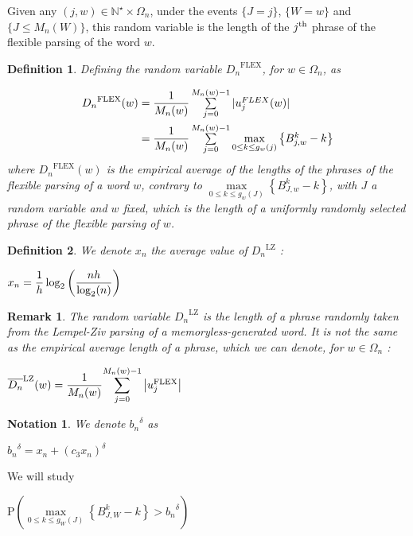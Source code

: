 \documentclass[11pt]{article}
\newtheorem{df}{Definition}
\newtheorem{rmk}{Remark}
\newtheorem{nota}{Notation}
\newcommand{\proba}[1]{\text{P} \left( #1 \right) }
\newcommand{\centers}[2][2]{
    \begin{center}
    {#2}\end{center}}
\newcommand{\f}[2]{{
	\mathchoice%
		{\dfrac{#1}{#2}}
    	{\dfrac{#1}{#2}}
		{\frac{#1}{#2}}
		{\frac{#1}{#2}}
}}
\newcommand{\pa}[2][9]{\left( #2 \right)}
\newcommand\Sum[2]{\textstyle\sum\limits_{#1}^{#2}}
\newcommand{\SUM}[2]{{\displaystyle\sum\limits_{#1}^{#2}}}
\begin{document}
\noindent
Given any $(j,w) \in \mathbb{N}^{\star} \times \Omega_n$,
under the events $\{ J = j \}$, $\{ W = w \}$ and $\{ J \leq M_n(W) \}$, 
this random variable is the length of 
the $j^{\textmd{th}}$ phrase of the flexible parsing of the word $w$.

\begin{df}
Defining the random variable ${D_n}^{\text{FLEX}}$, for $w\in\Omega_n$, as

\begin{align*}
    {D_n}^{\text{FLEX}} (w)
        &= \f{1}{M_n(w)} \Sum{j=0}{M_n(w)-1} |u_j^{FLEX}(w)| \\
        &= \f{1}{M_n(w)} \Sum{j=0}{M_n(w)-1}  
                                \underset{ 0 \leq k \leq g_w(j) }{ \max } 
                                \left\{ { B_{j, w}^k - k } \right\}
\end{align*}
\noindent
where ${D_n}^{\text{FLEX}}(w)$ is the empirical average of the lengths of the phrases
of the flexible parsing of a word $w$, contrary to
        $\underset{ 0 \leq k \leq g_w(J) }{ \max } 
        \left\{ { B_{J, w}^k - k } \right\} $,
with $J$ a random variable and $w$ fixed,
which is the length of a uniformly randomly selected 
phrase of the flexible parsing of $w$. 
\end{df}

\begin{df}
    We denote $x_n$ the average value of ${D_n}^{\text{LZ}}$ :
    \centers{$x_n = \f1{h} \log_2 \pa{ \f{nh}{\log_2(n)} }$}
\end{df}

\begin{rmk}
    The random variable ${D_n}^{\text{LZ}}$ is the
    length of a phrase randomly taken from the 
    Lempel-Ziv parsing 
    of a memoryless-generated word. It is not the same as
    the empirical average length of a phrase, which we can
    denote,
    for $w \in \Omega_n$ :
    \centers{$ \overline{D_n}^{\text{LZ}}(w)
                = \f{1}{M_n(w)}
                    \SUM{j=0}{M_n(w)-1} \left| 
                                        u_j^{\text{FLEX}}
                                        \right| $}
\end{rmk}

\begin{nota}
    We denote ${b_n}^{\delta}$ as
    \centers{${b_n}^{\delta} = x_n + (c_3 x_n)^{\delta}$}
\end{nota}

\noindent
We will study
    \centers
    {$ \proba{ 
        \underset{ 0 \leq k \leq g_{\scriptscriptstyle W}(J) }{ \max } 
        \left\{ { B_{J, W}^k - k } \right\}
            > {b_n}^{\delta} } $}
            
\end{document}
